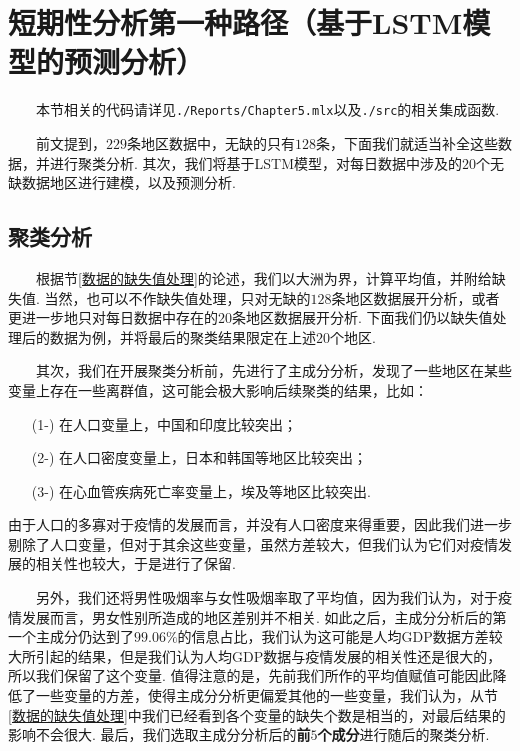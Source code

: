 \documentclass[a4paper, titlepage]{article}
\begin{document}
    \section{短期性分析第一种路径（基于LSTM模型的预测分析）}\label{第一种路径}
    　　本节相关的代码请详见\texttt{./Reports/Chapter5.mlx}以及\texttt{./src}的相关集成函数.

    　　前文提到，$229$条地区数据中，无缺的只有$128$条，下面我们就适当补全这些数据，并进行聚类分析. 其次，我们将基于LSTM模型，对每日数据中涉及的$20$个无缺数据地区进行建模，以及预测分析.
    \subsection{聚类分析}
    　　根据节\ref{数据的缺失值处理}的论述，我们以大洲为界，计算平均值，并附给缺失值. 当然，也可以不作缺失值处理，只对无缺的$128$条地区数据展开分析，或者更进一步地只对每日数据中存在的$20$条地区数据展开分析. 下面我们仍以缺失值处理后的数据为例，并将最后的聚类结果限定在上述$20$个地区.

    　　其次，我们在开展聚类分析前，先进行了主成分分析，发现了一些地区在某些变量上存在一些离群值，这可能会极大影响后续聚类的结果，比如：
    \begin{enumerate}[itemsep=-2pt]
        \item [(1-)] 在人口变量上，中国和印度比较突出；
        \item [(2-)] 在人口密度变量上，日本和韩国等地区比较突出；
        \item [(3-)] 在心血管疾病死亡率变量上，埃及等地区比较突出. 
    \end{enumerate}
    由于人口的多寡对于疫情的发展而言，并没有人口密度来得重要，因此我们进一步剔除了人口变量，但对于其余这些变量，虽然方差较大，但我们认为它们对疫情发展的相关性也较大，于是进行了保留. 
    
    　　另外，我们还将男性吸烟率与女性吸烟率取了平均值，因为我们认为，对于疫情发展而言，男女性别所造成的地区差别并不相关. 如此之后，主成分分析后的第一个主成分仍达到了$99.06\%$的信息占比，我们认为这可能是人均GDP数据方差较大所引起的结果，但是我们认为人均GDP数据与疫情发展的相关性还是很大的，所以我们保留了这个变量. 值得注意的是，先前我们所作的平均值赋值可能因此降低了一些变量的方差，使得主成分分析更偏爱其他的一些变量，我们认为，从节\ref{数据的缺失值处理}中我们已经看到各个变量的缺失个数是相当的，对最后结果的影响不会很大. 最后，我们选取主成分分析后的\textbf{前$5$个成分}进行随后的聚类分析. 
\end{document}
